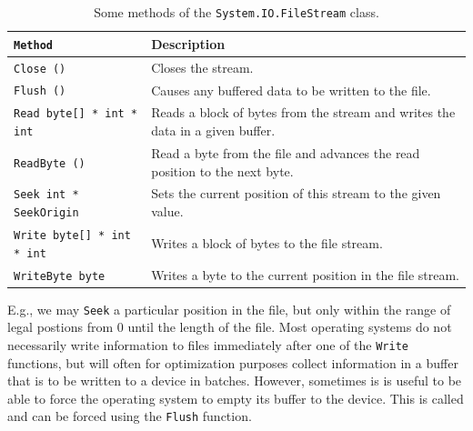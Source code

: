 \documentclass[fsharpNotes.tex]{subfiles}
\begin{document}
\begin{table}
  \centering
  \begin{tabularx}{\linewidth}{|l|X|}
    \hline
    \rowcolor{headerRowColor}\lstinline{Method} & Description\\
    \hline
    \lstinline{Close ()} & Closes the stream.\\
    \hline
    \lstinline{Flush ()} & Causes any buffered data to be written to the file.\\
    \hline
    \lstinline{Read byte[] * int * int} & Reads a block of bytes from the stream and writes the data in a given buffer.\\
    \hline
    \lstinline{ReadByte ()} & Read a byte from the file and advances the read position to the next byte.\\
    \hline
    \lstinline{Seek int * SeekOrigin} & Sets the current position of this stream to the given value.\\
    \hline
    \lstinline{Write byte[] * int * int} & Writes a block of bytes to the file stream.\\
    \hline
    \lstinline{WriteByte byte} & Writes a byte to the current position in the file stream.\\
    \hline
  \end{tabularx}
  \caption{Some methods of the \lstinline!System.IO.FileStream! class.}
  \label{tab:fileStreamMethods}
\end{table}
E.g., we may \lstinline!Seek! a particular position in the file, but only within the range of legal postions from 0 until the length of the file. Most operating systems do not necessarily write information to files immediately after one of the \lstinline!Write! functions, but will often for optimization purposes collect information in a buffer that is to be written to a device in batches. However, sometimes is is useful to be able to force the operating system to empty its buffer to the device. This is called  and can be forced using the \lstinline!Flush! function.
\end{document}
